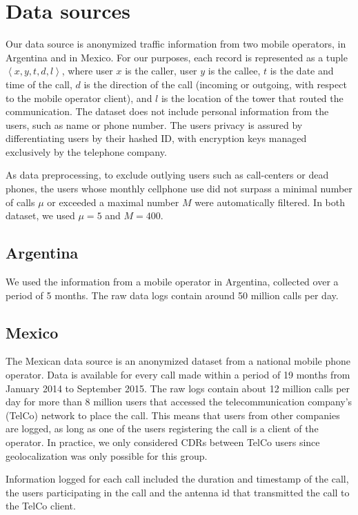 \section{Data sources}

Our data source is anonymized traffic information from two mobile operators, in Argentina and in Mexico.
For our purposes, each record is represented as a tuple $\left < x, y, t, d, l \right >$,
where user $x$ is the caller, user $y$ is the callee, $t$ is the date and time of the call,
$d$ is the direction of the call (incoming or outgoing, with respect to the mobile operator client), and $l$ is the location of the tower that routed the communication.
The dataset does not include personal information from the users, such as name or phone number. The users privacy is assured by differentiating users by their hashed ID, with encryption keys managed exclusively by the telephone company.

As data preprocessing, to exclude outlying users such as call-centers or dead phones, the users whose monthly cellphone use did not surpass a minimal number of calls $\mu$ or exceeded a maximal number $M$ were automatically filtered. In both dataset, we used $\mu = 5$ and $M = 400$.

\subsection{Argentina}

We used the information from a mobile operator in Argentina, collected over a period of 5 months. The raw data logs contain around 50 million calls per day.

\subsection{Mexico}

The Mexican data source is an anonymized dataset from a national mobile phone operator. Data is available for every call made within a period of 19 months from January 2014 to September 2015. The raw logs contain about 12 million calls per day for more than 8 million users that accessed the telecommunication company's (TelCo) network to place the call. This means that users from other companies are logged, as long as one of the users registering the call is a client of the operator. In practice, we only considered CDRs between TelCo users since geolocalization was only possible for this group.

Information logged for each call included the duration and timestamp of the call, the users participating in the call and the antenna id that transmitted the call to the TelCo client. 

